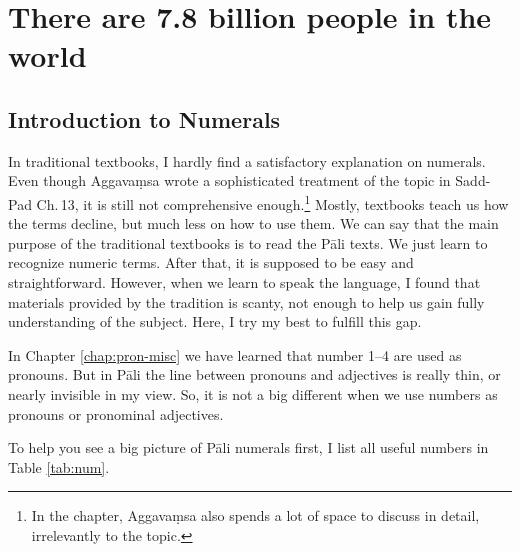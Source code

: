 \chapter[There are 7.8 billion people]{There are 7.8 billion people in the world}\label{chap:num}

{}
\section*{Introduction to Numerals}

In traditional textbooks, I hardly find a satisfactory explanation on numerals. Even though Aggava\d msa wrote a sophisticated treatment of the topic in Sadd-Pad Ch.\,13, it is still not comprehensive enough.\footnote{In the chapter, Aggava\d msa also spends a lot of space to discuss  in detail, irrelevantly to the topic.} Mostly, textbooks teach us how the terms decline, but much less on how to use them. We can say that the main purpose of the traditional textbooks is to read the P\=ali texts. We just learn to recognize numeric terms. After that, it is supposed to be easy and straightforward. However, when we learn to speak the language, I found that materials provided by the tradition is scanty, not enough to help us gain fully understanding of the subject. Here, I try my best to fulfill this gap.

In Chapter \ref{chap:pron-misc} we have learned that number 1--4 are used as pronouns. But in P\=ali the line between pronouns and adjectives is really thin, or nearly invisible in my view. So, it is not a big different when we use numbers as pronouns or pronominal adjectives.

To help you see a big picture of P\=ali numerals first, I list all useful numbers in Table \ref{tab:num}.

